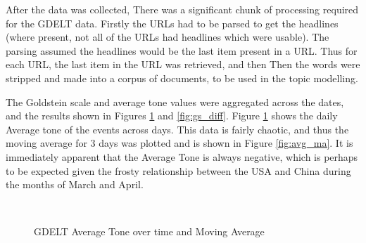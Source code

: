 After the data was collected, There was a significant chunk of processing required for the GDELT data. Firstly the URLs had to be parsed to get the headlines (where present, not all of the URLs had headlines which were usable). The parsing assumed the headlines would be the last item present in a URL. Thus for each URL, the last item in the URL was retrieved, and then  Then the words were stripped and made into a corpus of documents, to be used in the topic modelling. 

The Goldstein scale and average tone values were aggregated across the dates, and the results shown in Figures \ref{fig:avg_tone_diff} and \ref{fig:gs_diff}. Figure \ref{fig:avg_tone_diff} shows the daily Average tone of the events across days. This data is fairly chaotic, and thus the moving average for 3 days was plotted and is shown in Figure \ref{fig:avg_ma}. It is immediately apparent that the Average Tone is always negative, which is perhaps to be expected given the frosty relationship between the USA and China during the months of March and April. 
 
 \begin{figure}[H]
 	\centering
 	\\
 	\caption{GDELT Average Tone over time and Moving Average}
 	\label{fig:avg_tone_diff}
 \end{figure}
 
